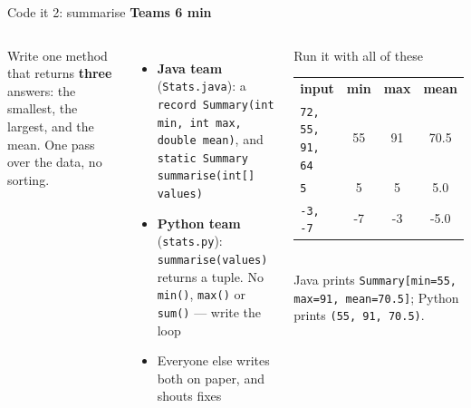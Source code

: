 \documentclass[aspectratio=169]{beamer}
\newcommand{\code}[1]{\texttt{#1}}
\newcommand{\timing}[2]{\hfill{\small\textcolor{bkblue}{\textbf{#1 \textbullet{} #2}}}}
\begin{document}
\begin{frame}[fragile]{Code it 2: summarise \timing{Teams}{6 min}}
  \begin{columns}[T,onlytextwidth]
    Write one method that returns \textbf{three} answers: the smallest, the largest, and the
    mean. One pass over the data, no sorting.
    \begin{itemize}[itemsep=0.25em]
      \small
      \item \textbf{Java team} (\code{Stats.java}): a \code{record Summary(int min, int
        max, double mean)}, and \code{static Summary summarise(int[] values)}
      \item \textbf{Python team} (\code{stats.py}): \code{summarise(values)} returns a
        tuple. No \code{min()}, \code{max()} or \code{sum()} --- write the loop
      \item Everyone else writes both on paper, and shouts fixes
    \end{itemize}
    \begin{discussionbox}{Run it with all of these}
      \small
      \renewcommand{\arraystretch}{1.15}
      \begin{tabular}{@{}l@{\quad}c@{\quad}c@{\quad}c@{}}
        \textbf{input} & \textbf{min} & \textbf{max} & \textbf{mean}\\
        \code{72, 55, 91, 64} & 55 & 91 & 70.5\\
        \code{5} & 5 & 5 & 5.0\\
        \code{-3, -7} & -7 & -3 & -5.0\\
      \end{tabular}\\[0.4em]
      \footnotesize Java prints \code{Summary[min=55, max=91, mean=70.5]}; Python prints
      \code{(55, 91, 70.5)}.
    \end{discussionbox}
  \end{columns}
\end{frame}
\end{document}
